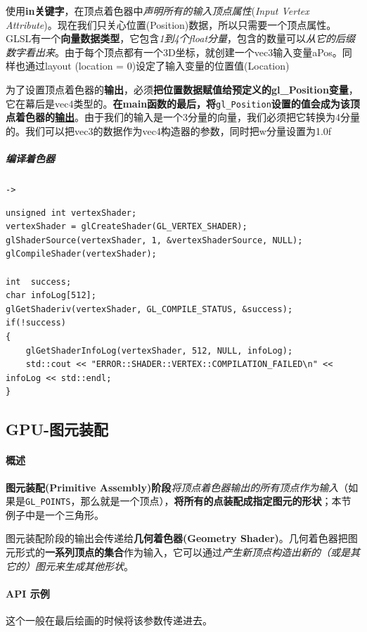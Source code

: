 \documentclass[UTF8,a4paper,12pt]{ctexbook}
\begin{document}
					使用\textbf{in关键字}，在顶点着色器中\textit{声明所有的输入顶点属性}(\textit{Input Vertex Attribute})。现在我们只关心位置(Position)数据，所以只需要一个顶点属性。GLSL有一个\textbf{向量数据类型}，它包含\textit{1到4个float分量}，包含的数量可以\textit{从它的后缀数字看出来}。由于每个顶点都有一个3D坐标，就创建一个vec3输入变量aPos。同样也通过layout (location = 0)设定了输入变量的位置值(Location)
					
					为了设置顶点着色器的\textbf{输出}，必须\textbf{把位置数据赋值给预定义的gl\_Position变量}，它在幕后是vec4类型的。\textbf{在main函数的最后，将}\verb|gl_Position|\textbf{设置的值会成为该顶点着色器的\underline{输出}}。由于我们的输入是一个3分量的向量，我们必须把它转换为4分量的。我们可以把vec3的数据作为vec4构造器的参数，同时把w分量设置为1.0f
				
				
				\subparagraph{编译着色器}\verb|->|
				
					\begin{lstlisting}
unsigned int vertexShader;
vertexShader = glCreateShader(GL_VERTEX_SHADER);
glShaderSource(vertexShader, 1, &vertexShaderSource, NULL);
glCompileShader(vertexShader);	

int  success;
char infoLog[512];
glGetShaderiv(vertexShader, GL_COMPILE_STATUS, &success);	
if(!success)
{
    glGetShaderInfoLog(vertexShader, 512, NULL, infoLog);
    std::cout << "ERROR::SHADER::VERTEX::COMPILATION_FAILED\n" << infoLog << std::endl;
}				
					\end{lstlisting}
				
				
				
		\subsection{GPU-图元装配}
			\paragraph{概述}		
				\textbf{图元装配(Primitive Assembly)阶段}\textit{将顶点着色器输出的所有顶点作为输入}（如果是\verb|GL_POINTS|，那么就是一个顶点），\textbf{将所有的点装配成指定图元的形状}；本节例子中是一个三角形。
			
				图元装配阶段的输出会传递给\textbf{几何着色器(Geometry Shader)}。几何着色器把图元形式的\textbf{一系列顶点的集合}作为输入，它可以通过\textit{产生新顶点构造出新的（或是其它的）图元来生成其他形状}。
			
			\paragraph{API 示例}
				这个一般在最后绘画的时候将该参数传递进去。
				
\end{document}
